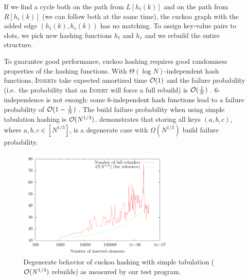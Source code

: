 If we find a cycle both on the path from $L[h_\ell(k)]$ and on the path from
$R[h_r(k)]$ (we can follow both at the same time), the cuckoo graph with
the added edge $(h_\ell(k),h_r(k))$ has no matching. To assign key-value pairs
to slots, we pick new hashing functions $h_\ell$ and $h_r$ and we rebuild
the entire structure.

To guarantee good performance, cuckoo hashing requires good randomness
properties of the hashing functions.
With $\Theta(\log N)$-independent hash functions, \textsc{Insert}s take
expected amortized time $\mathcal{O}(1)$ and the failure probability (i.e.\ the
probability that an \textsc{Insert} will force a full rebuild) is
$\mathcal{O}(\frac{1}{N})$ \cite{cuckoo-hashing}.
6-independence is not enough: some 6-independent hash functions lead to a
failure probability of $\mathcal{O}(1-\frac{1}{N})$ \cite{cuckoo-hashing-indep-bounds}.
The build failure probability when using simple tabulation hashing is
$\mathcal{O}(N^{1/3})$. \cite{power-of-simple-tab} demonstrates that storing all keys
$(a,b,c)$, where $a,b,c\in[N^{1/3}]$, is a degenerate case with
$\Omega(N^{1/3})$ build failure probability.

\begin{figure}
	\centering
	\includegraphics[width=0.7\textwidth]{img/cuckoo/results}
	\caption{Degenerate behavior of cuckoo hashing
		with simple tabulation ($\mathcal{O}(N^{1/3})$ rebuilds)
		as measured by our test program.}
\end{figure}

